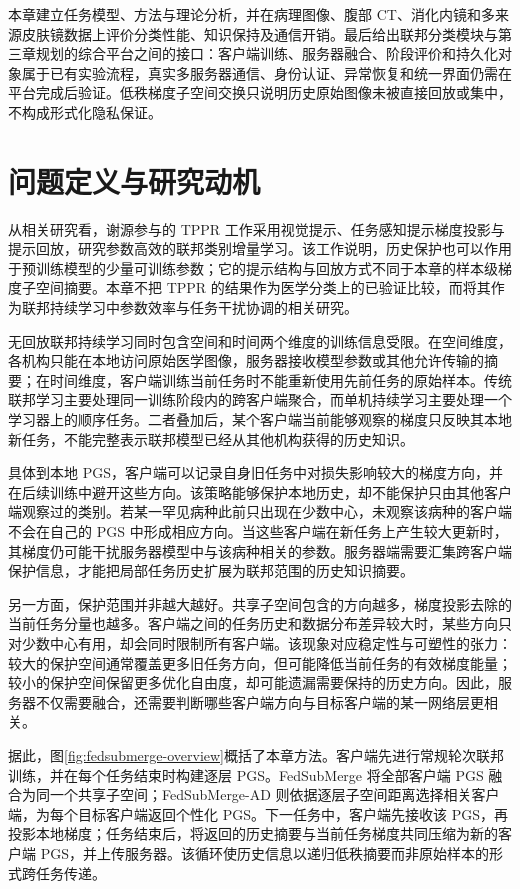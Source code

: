 本章建立任务模型、方法与理论分析，并在病理图像、腹部 CT、消化内镜和多来源皮肤镜数据上评价分类性能、知识保持及通信开销。最后给出联邦分类模块与第三章规划的综合平台之间的接口：客户端训练、服务器融合、阶段评价和持久化对象属于已有实验流程，真实多服务器通信、身份认证、异常恢复和统一界面仍需在平台完成后验证。低秩梯度子空间交换只说明历史原始图像未被直接回放或集中，不构成形式化隐私保证。

\section{问题定义与研究动机}
\label{sec:fedsubmerge-motivation}

从相关研究看，谢源参与的 TPPR 工作采用视觉提示、任务感知提示梯度投影与提示回放，研究参数高效的联邦类别增量学习\cite{ke2025tppr}。该工作说明，历史保护也可以作用于预训练模型的少量可训练参数；它的提示结构与回放方式不同于本章的样本级梯度子空间摘要。本章不把 TPPR 的结果作为医学分类上的已验证比较，而将其作为联邦持续学习中参数效率与任务干扰协调的相关研究。

无回放联邦持续学习同时包含空间和时间两个维度的训练信息受限。在空间维度，各机构只能在本地访问原始医学图像，服务器接收模型参数或其他允许传输的摘要；在时间维度，客户端训练当前任务时不能重新使用先前任务的原始样本。传统联邦学习主要处理同一训练阶段内的跨客户端聚合，而单机持续学习主要处理一个学习器上的顺序任务。二者叠加后，某个客户端当前能够观察的梯度只反映其本地新任务，不能完整表示联邦模型已经从其他机构获得的历史知识。

具体到本地 PGS，客户端可以记录自身旧任务中对损失影响较大的梯度方向，并在后续训练中避开这些方向。该策略能够保护本地历史，却不能保护只由其他客户端观察过的类别。若某一罕见病种此前只出现在少数中心，未观察该病种的客户端不会在自己的 PGS 中形成相应方向。当这些客户端在新任务上产生较大更新时，其梯度仍可能干扰服务器模型中与该病种相关的参数。服务器端需要汇集跨客户端保护信息，才能把局部任务历史扩展为联邦范围的历史知识摘要。

另一方面，保护范围并非越大越好。共享子空间包含的方向越多，梯度投影去除的当前任务分量也越多。客户端之间的任务历史和数据分布差异较大时，某些方向只对少数中心有用，却会同时限制所有客户端。该现象对应稳定性与可塑性的张力：较大的保护空间通常覆盖更多旧任务方向，但可能降低当前任务的有效梯度能量；较小的保护空间保留更多优化自由度，却可能遗漏需要保持的历史方向。因此，服务器不仅需要融合，还需要判断哪些客户端方向与目标客户端的某一网络层更相关。

据此，图\ref{fig:fedsubmerge-overview}概括了本章方法。客户端先进行常规轮次联邦训练，并在每个任务结束时构建逐层 PGS。FedSubMerge 将全部客户端 PGS 融合为同一个共享子空间；FedSubMerge-AD 则依据逐层子空间距离选择相关客户端，为每个目标客户端返回个性化 PGS。下一任务中，客户端先接收该 PGS，再投影本地梯度；任务结束后，将返回的历史摘要与当前任务梯度共同压缩为新的客户端 PGS，并上传服务器。该循环使历史信息以递归低秩摘要而非原始样本的形式跨任务传递。


